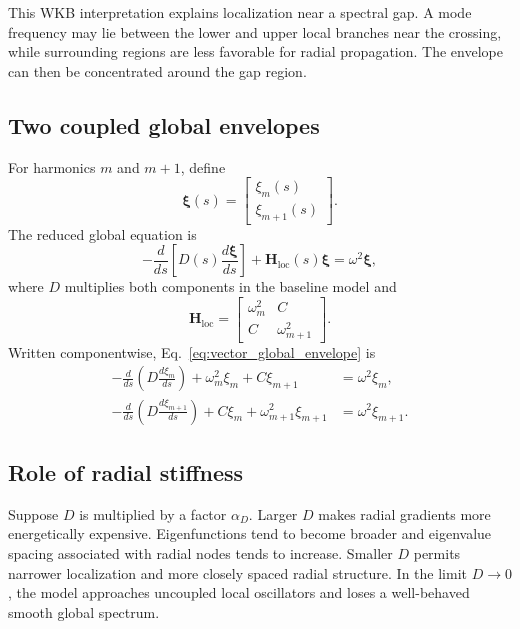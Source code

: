 This WKB interpretation explains localization near a spectral gap. A mode frequency may lie between the lower and upper local branches near the crossing, while surrounding regions are less favorable for radial propagation. The envelope can then be concentrated around the gap region.

\subsection{Two coupled global envelopes}
For harmonics $m$ and $m+1$, define
\begin{equation}
\boldsymbol\xi(s)=
\begin{bmatrix}
\xi_m(s)\\
\xi_{m+1}(s)
\end{bmatrix}.
\end{equation}
The reduced global equation is
\begin{equation}
-\frac{d}{ds}\left[D(s)\frac{d\boldsymbol\xi}{ds}\right]
+\mathbf H_{\mathrm{loc}}(s)\boldsymbol\xi
=\omega^2\boldsymbol\xi,
\label{eq:vector_global_envelope}
\end{equation}
where $D$ multiplies both components in the baseline model and
\begin{equation}
\mathbf H_{\mathrm{loc}}=
\begin{bmatrix}
\omega_m^2&C\\
C&\omega_{m+1}^2
\end{bmatrix}.
\end{equation}
Written componentwise, Eq.~\eqref{eq:vector_global_envelope} is
\begin{align}
-\frac{d}{ds}\left(D\frac{d\xi_m}{ds}\right)
+\omega_m^2\xi_m+C\xi_{m+1}&=\omega^2\xi_m,
\label{eq:global_m_textbook}\\
-\frac{d}{ds}\left(D\frac{d\xi_{m+1}}{ds}\right)
+C\xi_m+\omega_{m+1}^2\xi_{m+1}&=\omega^2\xi_{m+1}.
\label{eq:global_mp1_textbook}
\end{align}

\subsection{Role of radial stiffness}
Suppose $D$ is multiplied by a factor $\alpha_D$. Larger $D$ makes radial gradients more energetically expensive. Eigenfunctions tend to become broader and eigenvalue spacing associated with radial nodes tends to increase. Smaller $D$ permits narrower localization and more closely spaced radial structure. In the limit $D\rightarrow0$, the model approaches uncoupled local oscillators and loses a well-behaved smooth global spectrum.

